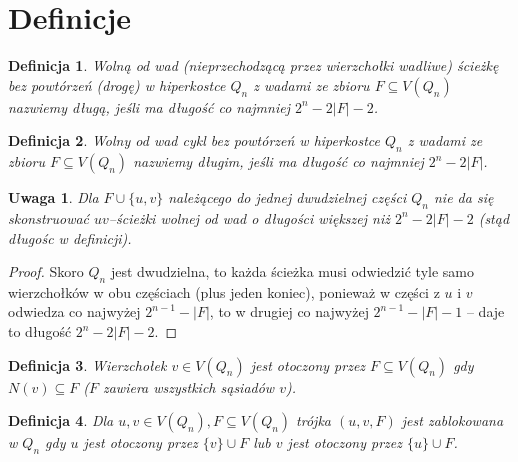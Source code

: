 \documentclass{pracamgr}
\newtheorem{defi}{Definicja}[section] %
\newtheorem{remark}[theorem]{Uwaga}
\begin{document}
  \section{Definicje}
   \begin{defi}\label{dluga sciezka}
    Wolną od wad (nieprzechodzącą przez wierzchołki wadliwe)
    ścieżkę bez powtórzeń (drogę) w hiperkostce $Q_n$ z wadami ze zbioru $F\subseteq V(Q_n)$ nazwiemy długą, jeśli ma długość co najmniej $2^n-2|F|-2$.
   \end{defi}
   \begin{defi}\label{dlugi cykl}
    Wolny od wad cykl bez powtórzeń w hiperkostce $Q_n$ z wadami ze zbioru $F\subseteq V(Q_n)$ nazwiemy długim, jeśli ma długość co najmniej $2^n-2|F|$.
   \end{defi}
   \begin{remark}\label{dluga sciezka- nie da sie dluzszej}
    Dla $F\cup\{u,v\}$ należącego do jednej dwudzielnej części $Q_n$ nie da się skonstruować $uv$--ścieżki wolnej od wad o długości większej niż $2^n-2|F|-2$
    (stąd długośc w definicji).
   \end{remark}
   \begin{proof}
    Skoro $Q_n$ jest dwudzielna, to każda ścieżka musi odwiedzić tyle samo wierzchołków w obu częściach (plus jeden koniec), ponieważ w części z $u$ i $v$
    odwiedza co najwyżej $2^{n-1}-|F|$, to w drugiej co najwyżej $2^{n-1}-|F|-1$ -- daje to długość $2^n-2|F|-2$.
   \end{proof}
   \begin{defi}\label{wierzcholek otoczony}
    Wierzchołek $v\in V(Q_n)$ jest \emph{otoczony} przez $F\subseteq V(Q_n)$ gdy $N(v)\subseteq F$ ($F$ zawiera wszystkich sąsiadów $v$).
   \end{defi}
   \begin{defi}\label{para zablokowana}
    Dla $u,v\in V(Q_n), F\subseteq V(Q_n)$
    trójka $(u,v,F)$ jest \emph{zablokowana w $Q_n$} gdy $u$ jest otoczony przez $\{v\}\cup F$ lub $v$ jest otoczony przez $\{u\}\cup F$.
   \end{defi}
\end{document}

